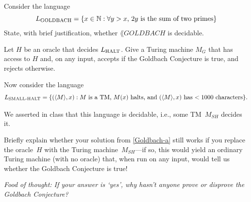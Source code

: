 \documentclass[11pt,addpoints,answers]{exam}
\begin{document}
\begin{questions}
  \begin{parts}
    \bonuspart [2] Consider the language
    \[
        L_{\text{GOLDBACH}} = \{x \in \mathbb{N}: \text{$\forall y > x$, $2y$ is the sum of two primes}\}
    \]
    State, with brief justification, whether $\lang{GOLDBACH}$ is decidable.

    \begin{solution} \end{solution}
    

    
    \bonuspart [2]
    Let $H$ be an oracle that decides $L_{\text{HALT}}$.
    Give a Turing machine $M_G$ that has access to $H$ and, on any input, accepts if the Goldbach Conjecture is true, and rejects otherwise.

     \label{Goldbach-a}
    
    \begin{solution} \end{solution}


    \bonuspart [1]
    Now consider the language
    \[ 
        L_{\text{SMALL-HALT}} = \{(\langle M\rangle,x) : M \text{ is a TM, } M(x) \text{ halts, and } (\langle M\rangle,x) \text{ has $< 1000$ characters}\} .
    \] 
    
    We asserted in class that this language is decidable, i.e., some TM~$M_{SH}$ decides it.

    Briefly explain whether your solution from \cref{Goldbach-a} still works if you replace the oracle~$H$ with the Turing machine~$M_{SH}$---if so, this would yield an ordinary Turing machine (with no oracle) that, when run on any input, would tell us whether the Goldbach Conjecture is true! 
    
    \emph{Food of thought: If your answer is `yes', why hasn't anyone prove or disprove the Goldbach Conjecture?}
      
    \begin{solution} \end{solution}

  \end{parts}
  
\end{questions}
\end{document}
